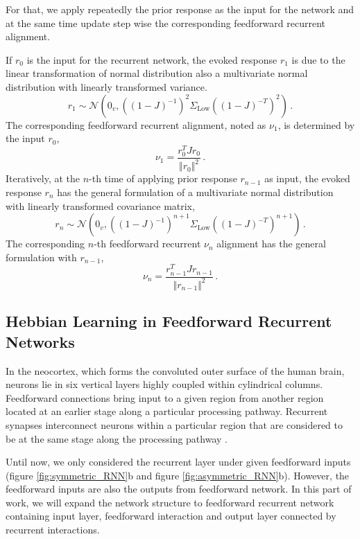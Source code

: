 \documentclass[11pt]{article}
\begin{document}
{	For that, we apply repeatedly the prior response as the input for the network and at the same time update step wise the corresponding feedforward recurrent alignment. 
	
	If $r_0$ is the input for the recurrent network, the evoked response $r_1$ is due to the linear transformation of normal distribution also a multivariate normal distribution with linearly transformed variance.
		\begin{equation}
			r_1 \sim \mathcal{N}\left(0_v, \left((1-J)^{-1}\right)^2 \Sigma_{\text{Low}} \left((1-J)^{-T}\right)^2\right) \, .
		\end{equation}
	The corresponding feedforward recurrent alignment, noted as $\nu_1$, is determined by the input $r_0$,
		\begin{equation}
			\nu_1 = \frac{r_0^T J r_0}{\Vert r_0 \Vert^2}\, .
		\end{equation}
	Iteratively, at the $n$-th time of applying prior response $r_{n-1}$ as input, the evoked response $r_n$ has the general formulation of a multivariate normal distribution with linearly transformed covariance matrix,
		\begin{equation}
			r_n \sim \mathcal{N}\left( 0_v, \left((1-J)^{-1}\right)^{n+1} \Sigma_{\text{Low}} \left((1-J)^{-T}\right)^{n+1} \right) \,. 
		\end{equation}
	The corresponding $n$-th feedforward recurrent $\nu_n$ alignment has the general formulation with $r_{n-1}$,
		\begin{equation} \label{eq:update_ffrec}
			\nu_n = \frac{r_{n-1}^T J r_{n-1}}{\Vert r_{n-1} \Vert^2} \,.
		\end{equation}
	
	
	\clearpage
	\subsection{Hebbian Learning in Feedforward Recurrent Networks}
	In the neocortex, which forms the convoluted outer surface of the human brain, neurons lie in six vertical layers highly coupled within cylindrical columns. Feedforward connections bring input to a given region from another region located at an earlier stage along a particular processing pathway. Recurrent synapses interconnect neurons within a particular region that are considered to be at the same stage along the processing pathway \cite{dayan2005theoretical}. 
	
	Until now, we only considered the recurrent layer under given feedforward inputs (figure \ref{fig:symmetric_RNN}b and figure \ref{fig:asymmetric_RNN}b). However, the feedforward inputs are also the outputs from feedforward network. In this part of work, we will expand the network structure to feedforward recurrent network containing input layer, feedforward interaction and output layer connected by recurrent interactions.
	
}
\end{document}

